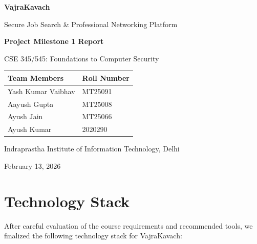 \documentclass[12pt,a4paper]{article}
\begin{document}
\begin{titlepage}
\centering
\vspace*{2cm}
{\Huge\bfseries\color{primary} VajraKavach\par}
\vspace{0.5cm}
{\Large Secure Job Search \& Professional Networking Platform\par}
\vspace{2cm}
{\LARGE\bfseries Project Milestone 1 Report\par}
\vspace{0.3cm}
{\large CSE 345/545: Foundations to Computer Security\par}
\vspace{2cm}

\begin{tabular}{ll}
\toprule
\textbf{Team Members} & \textbf{Roll Number} \\
\midrule
Yash Kumar Vaibhav & MT25091 \\
Aayush Gupta & MT25008 \\
Ayush Jain & MT25066 \\
Ayush Kumar & 2020290 \\
\bottomrule
\end{tabular}

\vspace{2cm}
{\large Indraprastha Institute of Information Technology, Delhi\par}
\vspace{0.3cm}
{\large February 13, 2026\par}
\vfill
\end{titlepage}

\tableofcontents
\newpage

\section{Technology Stack}

After careful evaluation of the course requirements and recommended tools, we finalized the following technology stack for VajraKavach:
\end{document}
